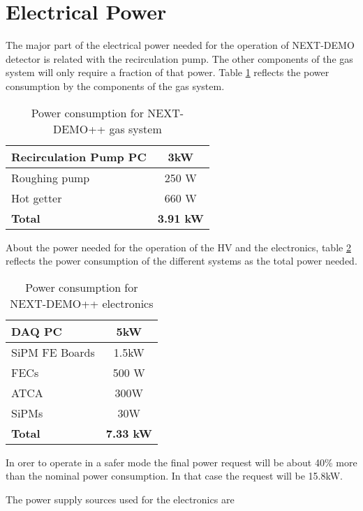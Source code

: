 \section{Electrical Power}
\label{sec:ElecPow}
The major part of the electrical power needed for the operation of NEXT-DEMO detector is related with the recirculation pump. The other components of the gas system will only require a fraction of that power. Table \ref{tab:gasPow} reflects the power consumption by the components of the gas system.


\begin{table}
\centering
\begin{tabular}{l c}
\hline
Recirculation Pump PC & 3kW\\ \hline
Roughing pump& 250 W\\\hline
Hot getter & 660 W \\ \hline \hline
\textbf{Total} & \textbf{3.91 kW}\\\hline
\end{tabular}
\caption{Power consumption for NEXT-DEMO++ gas system}
\label{tab:gasPow}
\end{table}


About the power needed for the operation of the HV and the electronics, table \ref{tab:elePow} reflects the power consumption of the different systems as the total power needed. 

\begin{table}
\centering
\begin{tabular}{l c}
\hline
DAQ PC & 5kW\\ \hline
SiPM FE Boards & 1.5kW \\ \hline
FECs & 500 W \\\hline
ATCA & 300W\\\hline
SiPMs & 30W \\\hline \hline
\textbf{Total} & \textbf{7.33 kW}\\\hline
\end{tabular}
\caption{Power consumption for NEXT-DEMO++ electronics}
\label{tab:elePow}
\end{table}

In orer to operate in a safer mode the final power request will be about 40\% more than the nominal power consumption. In that case the request will be 15.8kW.

The power supply sources used for the electronics are

